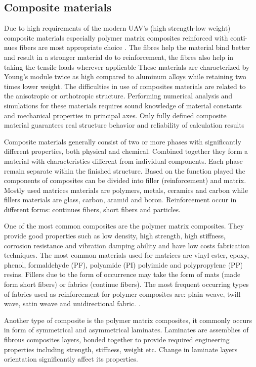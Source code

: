 \documentclass{article}
\begin{document}
\subsection{Composite materials}
Due to high requirements of the modern UAV’s (high strength-low weight) composite materials
especially polymer matrix composites reinforced with conti-nues fibers are most appropriate choice \citep{kassapoglou}. The fibres help the material bind better and result in a stronger material do to reinforcement, the fibres also help in taking the tensile loads wherever applicable
These materials are characterized by Young's module twice as high compared to aluminum alloys
while retaining two times lower weight. The difficulties in use of composites materials are related to the anisotropic or orthotropic structure. Performing numerical analysis and simulations for these materials requires sound knowledge of material constants and mechanical properties in principal axes. Only fully defined composite material guarantees real structure behavior and reliability of calculation results \citep{chung}

Composite materials generally consist of two or more phases with significantly different properties, both physical and chemical. Combined together they form a material with characteristics different from individual components. Each phase remain separate within the finished structure. Based on the function played the components of composites can be divided into filler (reinforcement) and matrix. Mostly used matrices materials are polymers, metals, ceramics and carbon while fillers materials are glass, carbon, aramid and boron. Reinforcement occur in different forms: continues fibers, short fibers and particles.

One of the most common composites are the polymer matrix composites. They provide good properties such as low density, high strength, high stiffness, corrosion resistance and vibration damping ability and have low costs fabrication techniques. The most common materials used for matrices are vinyl ester, epoxy, phenol, formaldehyde (PF), polyamide (PI) polyimide and polypropylene (PP) resins. Fillers due to the form of occurrence may take the form of mats (made
form short fibers) or fabrics (continue fibers). The most frequent occurring types of fabrics used as reinforcement for polymer composites are: plain weave, twill wave, satin weave and unidirectional fabric. \citep{krolikowski}.

Another type of composite is the polymer matrix composites, it commonly occurs in form of symmetrical and asymmetrical laminates. Laminates are assemblies of fibrous composites layers, bonded together to provide required engineering properties including strength, stiffness, weight etc. Change in laminate layers orientation significantly affect its properties. 
\end{document}
